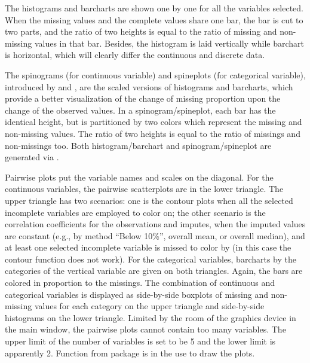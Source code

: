 \documentclass[article]{jss}
\begin{document}
The histograms and barcharts are shown one by one for all the variables selected. When the missing values and the complete values share one bar, the bar is cut to two parts, and the ratio of two heights is equal to the ratio of missing and non-missing values in that bar. Besides, the histogram is laid vertically while barchart is horizontal, which will clearly differ the continuous and discrete data.

The spinograms (for continuous variable) and spineplots (for categorical variable), introduced by \citet{hummel1996linked} and \citet{theus1999visualizing}, are the scaled versions of histograms and barcharts, which provide a better visualization of the change of missing proportion upon the change of the observed values. In a spinogram/spineplot, each bar has the identical height, but is partitioned by two colors which represent the missing and non-missing values. The ratio of two heights is equal to the ratio of missings and non-missings too. Both histogram/barchart and spinogram/spineplot are generated via  \citep{ggplot2}.

Pairwise plots put the variable names and scales on the diagonal. For the continuous variables, the pairwise scatterplots are in the lower triangle. The upper triangle has two scenarios: one is the contour plots when all the selected incomplete variables are employed to color on; the other scenario is the correlation coefficients for the observations and imputes, when the imputed values are constant (e.g., by method ``Below 10\%'', overall mean, or overall median), and at least one selected incomplete variable is missed to color by (in this case the contour function does not work). For the categorical variables, barcharts by the categories of the vertical variable are given on both triangles. Again, the bars are colored in proportion to the missings. The combination of continuous and categorical variables is displayed as side-by-side boxplots of missing and non-missing values for each category on the upper triangle and side-by-side histograms on the lower triangle. Limited by the room of the graphics device in the main window, the pairwise plots cannot contain too many variables. The upper limit of the number of variables is set to be 5 and the lower limit is apparently 2. Function  from package  \citep{ggally} is in the use to draw the plots.
\end{document}
